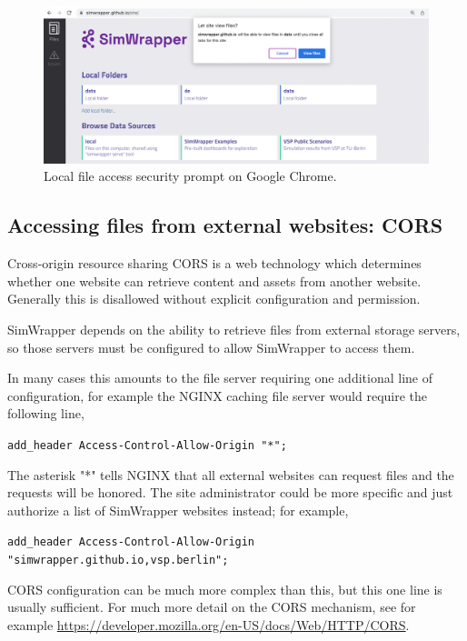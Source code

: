 \begin{figure}[ht]
  \centering
  \includegraphics[width=0.8\linewidth]{chapters/31-simwrapper/images/chrome-access.png}
  \caption{Local file access security prompt on Google Chrome.}
  \label{fig:simwrapper-chrome}
\end{figure}


\hypertarget{simwrapper-cors}{%
\subsection{Accessing files from external websites: CORS}
\label{simwrapper-cors}}

Cross-origin resource sharing \gls{CORS} is a web technology which determines whether one website can retrieve content and assets from another website. Generally this is disallowed without explicit configuration and permission.

SimWrapper depends on the ability to retrieve files from external storage servers, so those servers must be configured to allow SimWrapper to access them.

In many cases this amounts to the file server requiring one additional line of configuration, for example the NGINX caching file server would require the following line,

\texttt{add\_header Access-Control-Allow-Origin "*";}

The asterisk "*" tells NGINX that all external websites can request files and the requests will be honored. The site administrator could be more specific and just authorize a list of SimWrapper websites instead; for example,

\texttt{add\_header Access-Control-Allow-Origin "simwrapper.github.io,vsp.berlin";}

CORS configuration can be much more complex than this, but this one line is usually sufficient. For much more detail on the CORS mechanism, see for example \url{https://developer.mozilla.org/en-US/docs/Web/HTTP/CORS}.



